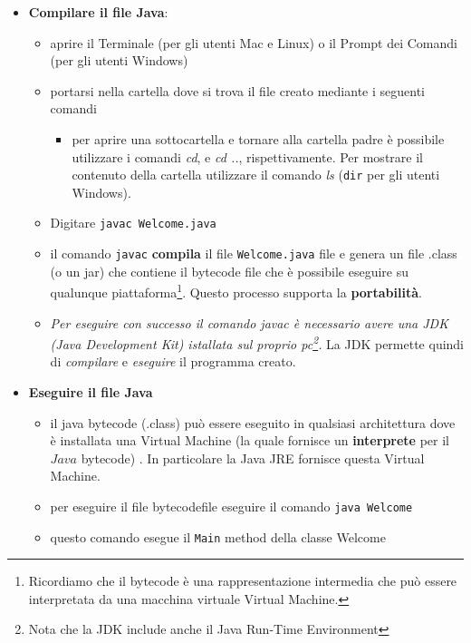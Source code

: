 \documentclass{article}
\theoremstyle{definition}
\begin{document}
\begin{itemize}
\item \textbf{Compilare il file Java}:
\begin{itemize}
\item aprire il Terminale (per gli utenti Mac e Linux) o il Prompt dei Comandi (per gli utenti Windows)
\item portarsi nella cartella dove si trova il file creato mediante i seguenti comandi
\begin{itemize}
\item per aprire una sottocartella e tornare alla cartella padre \`e possibile utilizzare i  comandi \emph{cd}, e \emph{cd ..}, rispettivamente. Per mostrare il contenuto della cartella utilizzare  il comando \emph{ls} (\texttt{dir} per gli utenti Windows).
\end{itemize}
\item Digitare \texttt{javac Welcome.java}
\item il comando \texttt{javac}  \textbf{compila} il file \texttt{Welcome.java} file e genera un file .class (o un jar) che contiene il bytecode file che \`e possibile eseguire su qualunque piattaforma\footnote{Ricordiamo che il bytecode \`e una rappresentazione intermedia che pu\`o essere interpretata da una macchina virtuale Virtual Machine.}. Questo processo supporta la  \textbf{portabilit\`a}. 
\item \emph{Per eseguire con successo il comando \emph{javac} \`e necessario avere una JDK (Java Development Kit) istallata sul proprio pc\footnote{Nota che la JDK include anche il Java Run-Time Environment}.} La JDK permette quindi di  \emph{compilare} e \emph{eseguire} il programma creato.
\end{itemize}
\end{itemize}

\begin{itemize}
\item \textbf{Eseguire il file Java}
\begin{itemize}
\item il java bytecode (.class) pu\`o essere eseguito in qualsiasi architettura dove \`e installata una Virtual Machine (la quale fornisce un  \textbf{interprete} per il $Java$ bytecode) . In particolare la Java JRE fornisce questa Virtual Machine.
\item per eseguire il file bytecodefile eseguire il comando \texttt{java Welcome}
\item questo comando esegue il   \texttt{Main} method della classe Welcome
\end{itemize}
\end{itemize}
\end{document}
